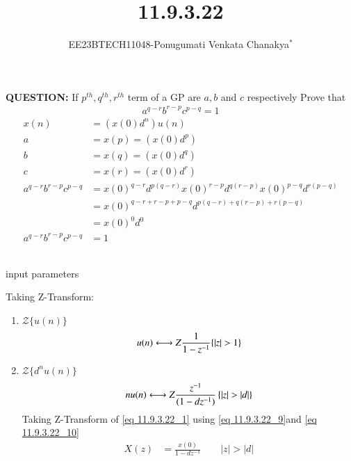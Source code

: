 \documentclass[journal,12pt,twocolumn]{IEEEtran}
\theoremstyle{remark}
\begin{document}
 
 \vspace{3cm}
 \title{\textbf{11.9.3.22}}
 \author{EE23BTECH11048-Ponugumati Venkata Chanakya$^{*}$%
 }
 \maketitle
 \newpage
 \bigskip
 \renewcommand{\thefigure}{\theenumi}
 \renewcommand{\thetable}{\theenumi}
 \textbf{QUESTION:}
If $p^{th},q^{th},r^{th} $ term of a GP are $a,b$ and $c$  respectively Prove that \\
\begin{align*}
    a^{q-r}b^{r-p}c^{p-q}=1
\end{align*}
\solution
\begin{align}
x(n)&=(x(0)d^n) u (n) \label{eq 11.9.3.22_1}\\
a&=x(p) = (x(0)d^p)\\
b&=x(q) = (x(0)d^q)\\
c&=x(r) = (x(0)d^r)\\
a^{q-r}b^{r-p}c^{p-q}&=x(0)^{q-r} d^{p(q-r)} x(0)^{r-p} d^{q(r-p)} x(0)^{p-q} d^{r(p-q)} \\
&= x(0)^{q-r+r-p+p-q} d^{p(q-r)+q(r-p)+r(p-q)}\\
&=x(0)^0 d^0\\
a^{q-r}b^{r-p}c^{p-q} &=1
\end{align}\

 \begin{table}[!ht]
    \centering
        
    \caption{input parameters}
    \label{tab:11_9_3_22}
\end{table}

Taking Z-Transform:
\begin{enumerate}
    \item $\mathcal{Z}\{u(n)\}$
\begin{align}
    u(n) \system{Z} \frac{1}{1-z^{-1}} \{\abs{z} > 1\}\label{eq 11.9.3.22_9} 
\end{align}
    \item $\mathcal{Z}\{d^{n}u(n)\}$ 
\begin{align}
    nu(n) \system{Z} \frac{z^{-1}}{(1-dz^{-1})}\, \{\abs{z} > \abs{d}\} \label{eq 11.9.3.22_10}
    \end{align}
    Taking Z-Transform of \eqref{eq 11.9.3.22_1} using \eqref{eq 11.9.3.22_9}and \eqref{eq 11.9.3.22_10}
    \begin{align}
    X(z) &= \frac{x(0)}{1-dz^{-1}} \qquad |z| > |d|
     \end{align}
\end{enumerate}
\end{document}
